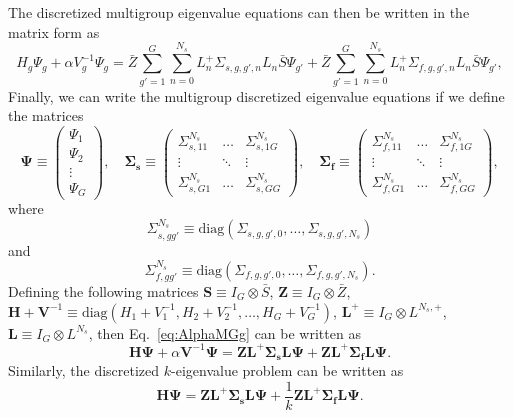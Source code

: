 The discretized multigroup eigenvalue equations can then be written in the matrix form as
\begin{equation*}
	H_{g} \Psi_{g} + \alpha V^{-1}_{g}\Psi_{g} = \bar{Z} \sum_{g'=1}^{G} \sum_{n=0}^{N_{s}} L_{n}^{+}\Sigma_{s,g,g',n}L_{n}\bar{S}\Psi_{g'}  +  \bar{Z} \sum_{g'=1}^{G} \sum_{n=0}^{N_{s}} L_{n}^{+}\Sigma_{f,g,g',n}L_{n}\bar{S}\Psi_{g'}, 
	\label{eq:AlphaMGg}
\end{equation*}
Finally, we can write the multigroup discretized eigenvalue equations if we define the matrices
\begin{equation*}
	\mathbf{\Psi} \equiv \begin{pmatrix}
					\Psi_{1} \\
					\Psi_{2} \\
					\vdots \\
					\Psi_{G}
				       \end{pmatrix}, \quad
	\mathbf{\Sigma_{s}} \equiv \begin{pmatrix}
					\Sigma_{s, 11}^{N_{s}} & \dots & \Sigma_{s,1G}^{N_{s}} \\
					\vdots & \ddots & \vdots \\
					\Sigma_{s, G1}^{N_{s}} & \dots & \Sigma_{s,GG}^{N_{s}}
					\end{pmatrix}, \quad 
	\mathbf{\Sigma_{f}} \equiv \begin{pmatrix}
					\Sigma_{f, 11}^{N_{s}} & \dots & \Sigma_{f,1G}^{N_{s}} \\
					\vdots & \ddots & \vdots \\
					\Sigma_{f, G1}^{N_{s}} & \dots & \Sigma_{f,GG}^{N_{s}}
					\end{pmatrix},
\end{equation*}
where 
\begin{equation*}
\Sigma_{s,gg'}^{N_{s}} \equiv \text{diag}(\Sigma_{s,g,g',0}, \dots, \Sigma_{s,g,g',N_{s}})
\end{equation*}
and
\begin{equation*}
\Sigma_{f,gg'}^{N_{s}} \equiv \text{diag}(\Sigma_{f,g,g',0}, \dots, \Sigma_{f,g,g',N_{s}}).
\end{equation*}
Defining the following matrices $\mathbf{S} \equiv I_{G} \otimes \bar{S}$, $\mathbf{Z} \equiv I_{G} \otimes \bar{Z}$, $\mathbf{H} + \mathbf{V}^{-1} \equiv \text{diag}(H_{1} + V^{-1}_{1}, H_{2} + V^{-1}_{2}, \dots, H_{G} + V^{-1}_{G})$, $\mathbf{L}^{+} \equiv I_{G} \otimes L^{N_{s},+}$, $\mathbf{L} \equiv I_{G} \otimes L^{N_{s}}$, then Eq.~\ref{eq:AlphaMGg} can be written as
\begin{equation}
	\mathbf{H}\mathbf{\Psi} + \alpha \mathbf{V}^{-1}\mathbf{\Psi} = \mathbf{Z} \mathbf{L}^{+}  \mathbf{\Sigma_{s}} \mathbf{L} \mathbf{\Psi} + \mathbf{Z} \mathbf{L}^{+}  \mathbf{\Sigma_{f}} \mathbf{L} \mathbf{\Psi}.
	\label{AlphaMG}
\end{equation}
Similarly, the discretized $k$-eigenvalue problem can be written as
\begin{equation}
	\mathbf{H}\mathbf{\Psi}  = \mathbf{Z} \mathbf{L}^{+}  \mathbf{\Sigma_{s}} \mathbf{L} \mathbf{\Psi} + \frac{1}{k}\mathbf{Z} \mathbf{L}^{+}  \mathbf{\Sigma_{f}} \mathbf{L} \mathbf{\Psi}.
	\label{kMG}
\end{equation}

